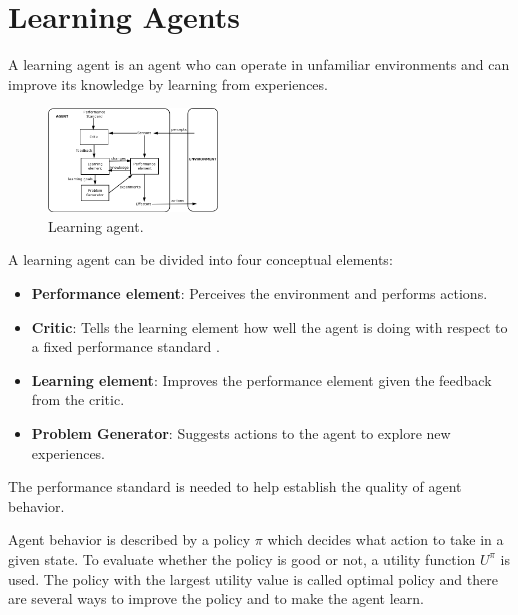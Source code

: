 \section{Learning Agents}
A learning agent is an agent who can operate in unfamiliar environments and can improve its knowledge by learning from experiences.

\begin{figure}[ht]
    \centering
    \includegraphics[width=0.4\textwidth]{images/IntelligentAgent-Learning.png}
    \caption{Learning agent.}
\end{figure}

\noindent
A learning agent can be divided into four conceptual elements:
\begin{itemize}
    \item \textbf{Performance element}: Perceives the environment and performs actions.
    \item \textbf{Critic}: Tells the learning element how well the agent is doing with respect to a fixed performance standard \cite{russell2002artificial}.
    \item \textbf{Learning element}: Improves the performance element given the feedback from the critic.
    \item \textbf{Problem Generator}: Suggests actions to the agent to explore new experiences.
\end{itemize}
The performance standard is needed to help establish the quality of agent behavior.

\vspace*{4mm}
\noindent
Agent behavior is described by a policy $\pi$ which decides what action to take in a given state.
To evaluate whether the policy is good or not, a utility function $U^{\pi}$ is used.
The policy with the largest utility value is called optimal policy and there are several ways to improve the policy and to make the agent learn.

